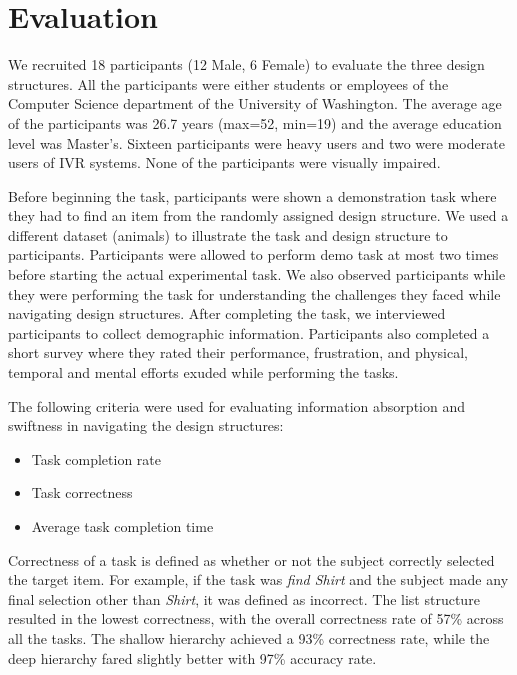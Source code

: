 \documentclass{sigchi}
\begin{document}
\section{Evaluation}
We recruited 18 participants (12 Male, 6 Female) to evaluate the three design structures. All the participants were either students or employees of the Computer Science department of the University of Washington. The average age of the participants was 26.7 years (max=52, min=19) and the average education level was Master's. Sixteen participants were heavy users and two were moderate users of IVR systems. None of the participants were visually impaired. 

Before beginning the task, participants were shown a demonstration task where they had to find an item from the randomly assigned design structure. We used a different dataset (animals) to illustrate the task and design structure to participants. Participants were allowed to perform demo task at most two times before starting the actual experimental task. We also observed participants while they were performing the task for understanding the challenges they faced while navigating design structures. After completing the task, we interviewed participants to collect demographic information. Participants also completed a short survey where they rated their performance, frustration, and physical, temporal and mental efforts exuded while performing the tasks. 

The following criteria were used for evaluating information absorption and swiftness in navigating the design structures:
\begin{itemize}
\item Task completion rate
\item Task correctness
\item Average task completion time
\end{itemize}

Correctness of a task is defined as whether or not the subject correctly selected the target item. For example, if the task was \textit{find Shirt} and the subject made any final selection other than \textit{Shirt}, it was defined as incorrect. The list structure resulted in the lowest correctness, with the overall correctness rate of 57\% across all the tasks. The shallow hierarchy achieved a 93\% correctness rate, while the deep hierarchy fared slightly better with 97\% accuracy rate.
\end{document}
